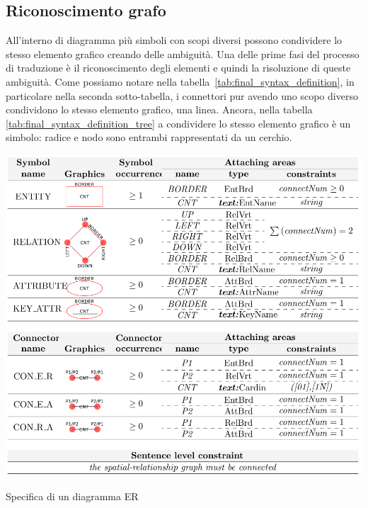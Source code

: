         \subsection{Riconoscimento grafo}
            All'interno di diagramma più simboli con scopi diversi possono condividere lo stesso elemento grafico creando delle ambiguità. Una delle prime fasi del processo di traduzione è il riconoscimento degli elementi e quindi la risoluzione di queste ambiguità. Come possiamo notare nella tabella~\ref{tab:final_syntax_definition}, in particolare nella seconda sotto-tabella, i connettori pur avendo uno scopo diverso condividono lo stesso elemento grafico, una linea.
            \newline
            Ancora, nella tabella \ref{tab:final_syntax_definition_tree} a condividere lo stesso elemento grafico è un simbolo: radice e nodo sono entrambi rappresentati da un cerchio.

            \begin{table}[htbp]
                \centering
                \includegraphics[scale=0.4]{Figure/final_syntax_definition.PNG}
                \caption{Specifica di un diagramma ER}
                \label{tab:final_syntax_definition}
            \end{table}

